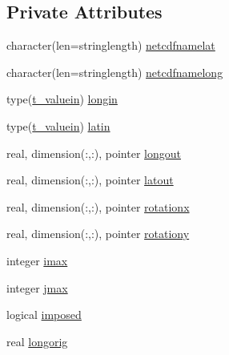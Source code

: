 \subsection*{Private Attributes}
\begin{DoxyCompactItemize}
\item 
character(len=stringlength) \mbox{\hyperlink{structmodulenetcdfcf__2__hdf5mohid_1_1t__longlat_a662a0556f1ff93bff17a6547e6798ddf}{netcdfnamelat}}
\item 
character(len=stringlength) \mbox{\hyperlink{structmodulenetcdfcf__2__hdf5mohid_1_1t__longlat_a858e3782739d012057d84f9ee8c61229}{netcdfnamelong}}
\item 
type(\mbox{\hyperlink{structmodulenetcdfcf__2__hdf5mohid_1_1t__valuein}{t\+\_\+valuein}}) \mbox{\hyperlink{structmodulenetcdfcf__2__hdf5mohid_1_1t__longlat_a35bab3aaaf5f3bae42420554433c7eee}{longin}}
\item 
type(\mbox{\hyperlink{structmodulenetcdfcf__2__hdf5mohid_1_1t__valuein}{t\+\_\+valuein}}) \mbox{\hyperlink{structmodulenetcdfcf__2__hdf5mohid_1_1t__longlat_a008c30ad1ecebaec38a9fd7297084a29}{latin}}
\item 
real, dimension(\+:,\+:), pointer \mbox{\hyperlink{structmodulenetcdfcf__2__hdf5mohid_1_1t__longlat_a485688f204f2c5759a6771e0cd60987a}{longout}}
\item 
real, dimension(\+:,\+:), pointer \mbox{\hyperlink{structmodulenetcdfcf__2__hdf5mohid_1_1t__longlat_a25adbff39598e039a290f1e0c6277570}{latout}}
\item 
real, dimension(\+:,\+:), pointer \mbox{\hyperlink{structmodulenetcdfcf__2__hdf5mohid_1_1t__longlat_a9c4f0272d82aeb14cdf0ba32778910e9}{rotationx}}
\item 
real, dimension(\+:,\+:), pointer \mbox{\hyperlink{structmodulenetcdfcf__2__hdf5mohid_1_1t__longlat_ae70b4b7f59761568390d6c1ef780c160}{rotationy}}
\item 
integer \mbox{\hyperlink{structmodulenetcdfcf__2__hdf5mohid_1_1t__longlat_aea32808e28dd64a9aa7f68f2a0f64e5e}{imax}}
\item 
integer \mbox{\hyperlink{structmodulenetcdfcf__2__hdf5mohid_1_1t__longlat_aa30cd5aaa150f6a2c0b2ccb04b4c0fff}{jmax}}
\item 
logical \mbox{\hyperlink{structmodulenetcdfcf__2__hdf5mohid_1_1t__longlat_a1f324bb51081246002557814732281f3}{imposed}}
\item 
real \mbox{\hyperlink{structmodulenetcdfcf__2__hdf5mohid_1_1t__longlat_a5a9b61465b8bb5cec6b8d2837160630d}{longorig}}
\item 

\end{DoxyCompactItemize}

